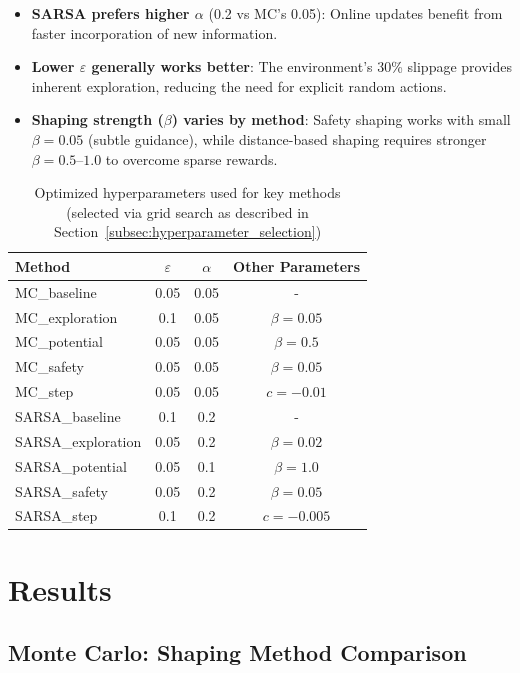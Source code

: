 \documentclass[11pt,a4paper]{article}
\begin{document}
\begin{itemize}
    \item \textbf{SARSA prefers higher $\alpha$} (0.2 vs MC's 0.05): Online updates benefit from faster incorporation of new information.
    \item \textbf{Lower $\varepsilon$ generally works better}: The environment's 30\% slippage provides inherent exploration, reducing the need for explicit random actions.
    \item \textbf{Shaping strength ($\beta$) varies by method}: Safety shaping works with small $\beta=0.05$ (subtle guidance), while distance-based shaping requires stronger $\beta=0.5$--$1.0$ to overcome sparse rewards.
\end{itemize}

\begin{table}[H]
\centering
\small
\caption{Optimized hyperparameters used for key methods (selected via grid search as described in Section~\ref{subsec:hyperparameter_selection})}
\label{tab:hyperparams}
\begin{tabular}{@{}lccc@{}}
\toprule
\textbf{Method} & $\varepsilon$ & $\alpha$ & \textbf{Other Parameters} \\ \midrule
MC\_baseline & 0.05 & 0.05 & - \\
MC\_exploration & 0.1 & 0.05 & $\beta=0.05$ \\
MC\_potential & 0.05 & 0.05 & $\beta=0.5$ \\
MC\_safety & 0.05 & 0.05 & $\beta=0.05$ \\
MC\_step & 0.05 & 0.05 & $c=-0.01$ \\
\midrule
SARSA\_baseline & 0.1 & 0.2 & - \\
SARSA\_exploration & 0.05 & 0.2 & $\beta=0.02$ \\
SARSA\_potential & 0.05 & 0.1 & $\beta=1.0$ \\
SARSA\_safety & 0.05 & 0.2 & $\beta=0.05$ \\
SARSA\_step & 0.1 & 0.2 & $c=-0.005$ \\
\bottomrule
\end{tabular}
\end{table}

\section{Results}

\subsection{Monte Carlo: Shaping Method Comparison}
\end{document}
